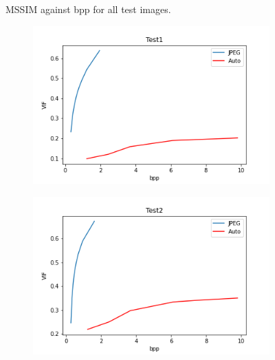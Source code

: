 \documentclass{article}
\begin{document}
\begin{figure}
\begin{subfigure}[b]{0.7 \textwidth}
    \end{subfigure}
    \caption{MSSIM against bpp for all test images.}
    \label{fig:objective_MSSIM}
\end{figure}


\begin{figure}
    \centering
    \begin{subfigure}[b]{0.7 \textwidth}
    \includegraphics[width=\textwidth]{Images/Plots/test1_VIF.png}
    \end{subfigure}
    \begin{subfigure}[b]{0.7 \textwidth}
    \includegraphics[width=\textwidth]{Images/Plots/test2_VIF.png}
    \end{subfigure}
    \begin{subfigure}[b]{0.7 \textwidth}

\end{subfigure}
\end{figure}
\end{document}
